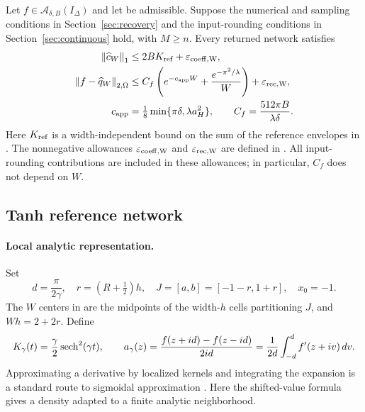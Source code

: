 \begin{theorem}
\label{thm:qi-numerics-explicit}
Let $f\in\mathcal A_{\delta,B}(I_\Delta)$ and let  be
admissible. Suppose the numerical and sampling conditions in
Section~\ref{sec:recovery} and the input-rounding conditions in
Section~\ref{sec:continuous} hold, with $M\ge n$.
Every returned network satisfies
\begin{align}
 \left\lVert \widehat c_W\right\rVert_1
 &\le 2BK_{\rm ref}+\varepsilon_{\rm coeff,W},
 \label{eq:reader-coeff}\\
 \left\lVert f-\widehat q_W\right\rVert_{2,\Omega}
 &\le C_f\left(e^{-c_{\mathrm{app}} W}+\frac{e^{-\pi^2/\lambda}}W\right)
       +\varepsilon_{\rm rec,W},
 \label{eq:reader-error}\\
 c_{\mathrm{app}}&=\tfrac18\min\{\pi\delta,\lambda a_H^2\},
 \qquad C_f=\frac{512\pi B}{\lambda\delta}.
 \label{eq:capp}
\end{align}
Here $K_{\rm ref}$ is a width-independent bound on the sum of the reference
envelopes in . The nonnegative allowances
$\varepsilon_{\rm coeff,W}$ and $\varepsilon_{\rm rec,W}$ are defined in
. All input-rounding contributions
are included in these allowances; in particular, $C_f$ does not depend on $W$.
\end{theorem}

\subsection{Tanh reference network}
\label{sec:local}
\label{sec:quadrature}
\label{sec:boundary}
\label{sec:coefficients}
\label{sec:witness}

\paragraph{Local analytic representation.}
Set
\begin{equation}
 d=\frac\pi{2\gamma},\quad r=(R+\tfrac12)h,
 \quad J=[a,b]=[-1-r,1+r],\quad x_0=-1.
 \label{eq:local-geometry}
\end{equation}
The $W$ centers in  are the midpoints of the width-$h$
cells partitioning $J$, and $Wh=2+2r$. Define
\begin{equation}
 K_\gamma(t)=\frac\gamma2\operatorname{sech}^2(\gamma t),\qquad
 a_\gamma(z)=\frac{f(z+id)-f(z-id)}{2id}
            =\frac1{2d}\int_{-d}^d f'(z+iv)\,dv.
 \label{eq:density}
\end{equation}
Approximating a derivative by localized kernels and integrating the expansion
is a standard route to sigmoidal approximation
\cite{Costarelli2015Approximation,Buhmann_Jager_2022quasiinterpolation}.
Here the shifted-value formula gives a density adapted to a finite analytic
neighborhood.

